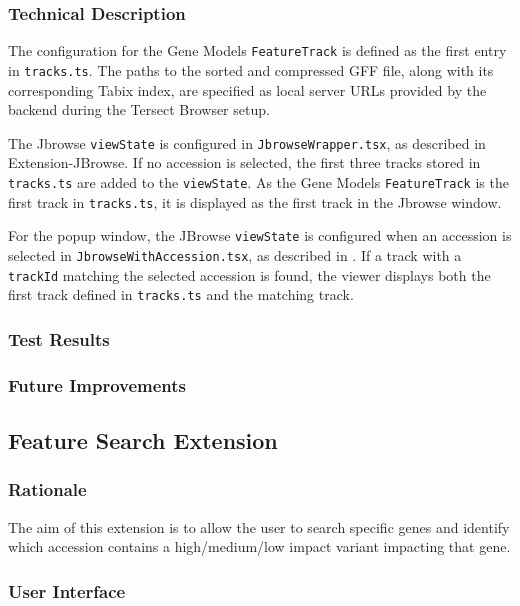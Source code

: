 \documentclass[12pt]{article}
\begin{document}
\subsubsection{Technical Description}
The configuration for the Gene Models \verb+FeatureTrack+ is defined as the first entry in \verb+tracks.ts+. The paths to the sorted and compressed GFF file, along with its corresponding Tabix index, are specified as local server URLs provided by the backend during the Tersect Browser setup. 

The Jbrowse \verb+viewState+ is configured in \verb+JbrowseWrapper.tsx+, as described in Extension-JBrowse. If no accession is selected, the first three tracks stored in \verb+tracks.ts+ are added to the \verb+viewState+. As the Gene Models \verb+FeatureTrack+ is the first track in \verb+tracks.ts+, it is displayed as the first track in the Jbrowse window. 

For the popup window, the JBrowse \verb+viewState+ is configured when an accession is selected in \verb+JbrowseWithAccession.tsx+, as described in . If a track with a \verb+trackId+ matching the selected accession is found, the viewer displays both the first track defined in \verb+tracks.ts+ and the matching track. 

\subsubsection{Test Results}
\subsubsection{Future Improvements}

\subsection{Feature Search Extension}
\subsubsection{Rationale}
The aim of this extension is to allow the user to search specific genes and identify which accession contains a high/medium/low impact variant impacting that gene.
\subsubsection{User Interface}
\end{document}
